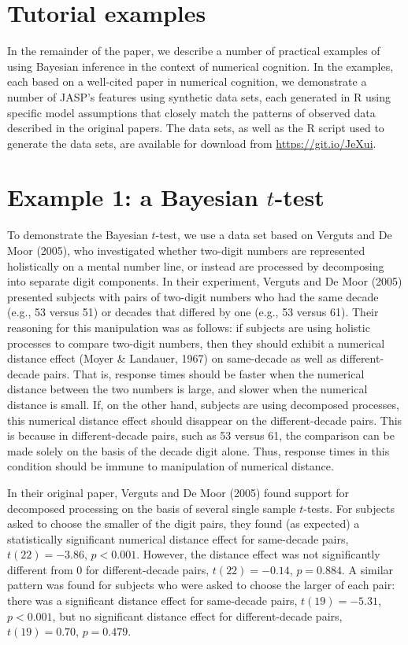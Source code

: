 \documentclass[english,,doc,floatsintext]{apa6}
\begin{document}
\hypertarget{tutorial-examples}{%
\section{Tutorial examples}\label{tutorial-examples}}

In the remainder of the paper, we describe a number of practical examples of using Bayesian inference in the context of numerical cognition. In the examples, each based on a well-cited paper in numerical cognition, we demonstrate a number of JASP's features using synthetic data sets, each generated in R using specific model assumptions that closely match the patterns of observed data described in the original papers. The data sets, as well as the R script used to generate the data sets, are available for download from \url{https://git.io/JeXui}.

\hypertarget{example-1-a-bayesian-t-test}{%
\section{\texorpdfstring{Example 1: a Bayesian \(t\)-test}{Example 1: a Bayesian t-test}}\label{example-1-a-bayesian-t-test}}

To demonstrate the Bayesian \(t\)-test, we use a data set based on Verguts and De Moor (2005), who investigated whether two-digit numbers are represented holistically on a mental number line, or instead are processed by decomposing into separate digit components. In their experiment, Verguts and De Moor (2005) presented subjects with pairs of two-digit numbers who had the same decade (e.g., 53 versus 51) or decades that differed by one (e.g., 53 versus 61). Their reasoning for this manipulation was as follows: if subjects are using holistic processes to compare two-digit numbers, then they should exhibit a numerical distance effect (Moyer \& Landauer, 1967) on same-decade as well as different-decade pairs. That is, response times should be faster when the numerical distance between the two numbers is large, and slower when the numerical distance is small. If, on the other hand, subjects are using decomposed processes, this numerical distance effect should disappear on the different-decade pairs. This is because in different-decade pairs, such as 53 versus 61, the comparison can be made solely on the basis of the decade digit alone. Thus, response times in this condition should be immune to manipulation of numerical distance.

In their original paper, Verguts and De Moor (2005) found support for decomposed processing on the basis of several single sample \(t\)-tests. For subjects asked to choose the smaller of the digit pairs, they found (as expected) a statistically significant numerical distance effect for same-decade pairs, \(t(22) = -3.86\), \(p<0.001\). However, the distance effect was not significantly different from 0 for different-decade pairs, \(t(22)=-0.14\), \(p=0.884\). A similar pattern was found for subjects who were asked to choose the larger of each pair: there was a significant distance effect for same-decade pairs, \(t(19)=-5.31\), \(p<0.001\), but no significant distance effect for different-decade pairs, \(t(19)=0.70\), \(p=0.479\).
\end{document}
